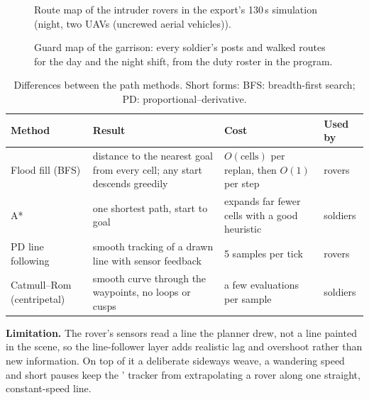 \begin{figure}[htbp]
\centering
{}
\caption{Route map of the intruder rovers in the export's 130\,s simulation (night, two UAVs (uncrewed aerial vehicles)).}
\label{fig:rovermap}
\end{figure}

\begin{figure}[htbp]
\centering
{}
\caption{Guard map of the garrison: every soldier's posts and walked routes for the day and the night shift, from the
duty roster in the program.}
\label{fig:guardmap}
\end{figure}

\begin{table}[htbp]
\caption{Differences between the path methods. Short forms: BFS: breadth-first search; PD: proportional--derivative.}
\centering\small
\begin{tabularx}{\linewidth}{@{}lXXl@{}}
\toprule
Method & Result & Cost & Used by\\\midrule
Flood fill (BFS) & distance to the nearest goal from every cell; any start descends greedily & $O(\text{cells})$ per replan, then $O(1)$ per step & rovers\\
A* & one shortest path, start to goal & expands far fewer cells with a good heuristic & soldiers\\
PD line following & smooth tracking of a drawn line with sensor feedback & 5 samples per tick & rovers\\
Catmull--Rom (centripetal) & smooth curve through the waypoints, no loops or cusps & a few evaluations per sample & soldiers\\
\bottomrule
\end{tabularx}
\end{table}

\textbf{Limitation.} The rover's sensors read a line the planner drew, not a line painted in the scene, so the
line-follower layer adds realistic lag and overshoot rather than new information. On top of it a deliberate sideways
weave, a wandering speed and short pauses keep the ' tracker from extrapolating a rover along one straight,
constant-speed line.
